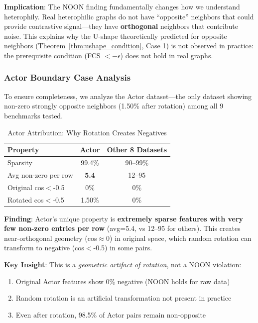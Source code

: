 \textbf{Implication}: The NOON finding fundamentally changes how we understand heterophily. Real heterophilic graphs do not have ``opposite'' neighbors that could provide contrastive signal---they have \textbf{orthogonal} neighbors that contribute noise. This explains why the U-shape theoretically predicted for opposite neighbors (Theorem~\ref{thm:ushape_condition}, Case 1) is not observed in practice: the prerequisite condition (FCS $< -\epsilon$) does not hold in real graphs.

\subsubsection{Actor Boundary Case Analysis}
\label{sec:actor_analysis}

To ensure completeness, we analyze the Actor dataset---the only dataset showing non-zero strongly opposite neighbors (1.50\% after rotation) among all 9 benchmarks tested.

\begin{table}[t]
\centering
\caption{Actor Attribution: Why Rotation Creates Negatives}
\label{tab:actor_attribution}
\small
\begin{tabular}{@{}lcc@{}}
\toprule
\textbf{Property} & \textbf{Actor} & \textbf{Other 8 Datasets} \\
\midrule
Sparsity & 99.4\% & 90--99\% \\
Avg non-zero per row & \textbf{5.4} & 12--95 \\
Original cos$<$-0.5 & 0\% & 0\% \\
Rotated cos$<$-0.5 & 1.50\% & 0\% \\
\bottomrule
\end{tabular}
\end{table}

\textbf{Finding}: Actor's unique property is \textbf{extremely sparse features with very few non-zero entries per row} (avg=5.4, vs 12--95 for others). This creates near-orthogonal geometry (cos$\approx$0) in original space, which random rotation can transform to negative (cos$<$-0.5) in some pairs.

\textbf{Key Insight}: This is a \textit{geometric artifact of rotation}, not a NOON violation:
\begin{enumerate}
    \item Original Actor features show 0\% negative (NOON holds for raw data)
    \item Random rotation is an artificial transformation not present in practice
    \item Even after rotation, 98.5\% of Actor pairs remain non-opposite
\end{enumerate}

